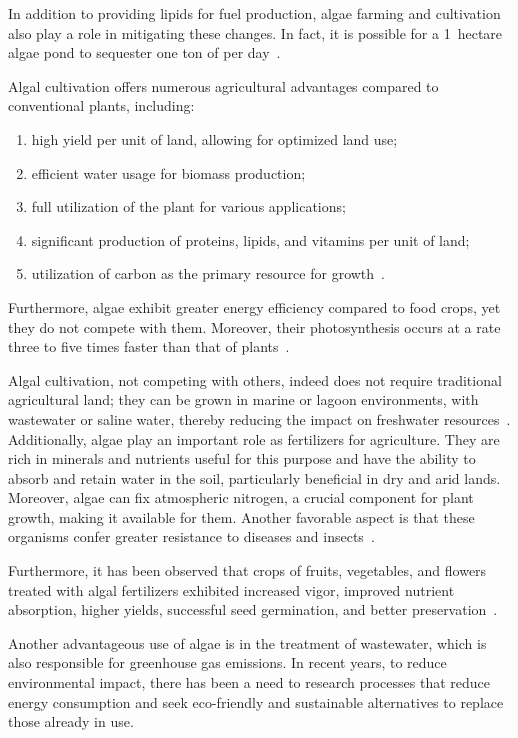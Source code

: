In addition to providing lipids for fuel production, algae farming and cultivation also play a role in mitigating these changes. In fact, it is possible for a \qty{1}{hectare} algae pond to sequester one ton of  per day~\parencite{proksch_growing_2013}.

Algal cultivation offers numerous agricultural advantages compared to conventional plants, including:
\begin{enumerate}
\item high yield per unit of land, allowing for optimized land use;
\item efficient water usage for biomass production;
\item full utilization of the plant for various applications;
\item significant production of proteins, lipids, and vitamins per unit of land;
\item utilization of carbon as the primary resource for growth~\parencite{sivakumar_role_2013s}.
\end{enumerate}

Furthermore, algae exhibit greater energy efficiency compared to food crops, yet they do not compete with them. Moreover, their photosynthesis occurs at a rate three to five times faster than that of plants~\parencite{salami_AlgaeBased_2021}.

Algal cultivation, not competing with others, indeed does not require traditional agricultural land; they can be grown in marine or lagoon environments, with wastewater or saline water, thereby reducing the impact on freshwater resources~\parencite{narala_Comparison_2016}. Additionally, algae play an important role as fertilizers for agriculture. They are rich in minerals and nutrients useful for this purpose and have the ability to absorb and retain water in the soil, particularly beneficial in dry and arid lands. Moreover, algae can fix atmospheric nitrogen, a crucial component for plant growth, making it available for them. Another favorable aspect is that these organisms confer greater resistance to diseases and insects~\parencite{garima_diverse_2015}.

Furthermore, it has been observed that crops of fruits, vegetables, and flowers treated with algal fertilizers exhibited increased vigor, improved nutrient absorption, higher yields, successful seed germination, and better preservation~\parencite{rupawalla_Algae_2021}.

Another advantageous use of algae is in the treatment of wastewater, which is also responsible for greenhouse gas emissions. In recent years, to reduce environmental impact, there has been a need to research processes that reduce energy consumption and seek eco-friendly and sustainable alternatives to replace those already in use.

